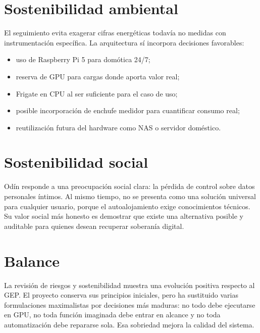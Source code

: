 \section{Sostenibilidad ambiental}
El seguimiento evita exagerar cifras energéticas todavía no medidas con instrumentación específica. La arquitectura sí incorpora decisiones favorables:
\begin{itemize}
  \item uso de Raspberry Pi 5 para domótica 24/7;
  \item reserva de GPU para cargas donde aporta valor real;
  \item Frigate en CPU al ser suficiente para el caso de uso;
  \item posible incorporación de enchufe medidor para cuantificar consumo real;
  \item reutilización futura del hardware como NAS o servidor doméstico.
\end{itemize}

\section{Sostenibilidad social}
Odín responde a una preocupación social clara: la pérdida de control sobre datos personales íntimos. Al mismo tiempo, no se presenta como una solución universal para cualquier usuario, porque el autoalojamiento exige conocimientos técnicos. Su valor social más honesto es demostrar que existe una alternativa posible y auditable para quienes desean recuperar soberanía digital.

\section{Balance}
La revisión de riesgos y sostenibilidad muestra una evolución positiva respecto al GEP. El proyecto conserva sus principios iniciales, pero ha sustituido varias formulaciones maximalistas por decisiones más maduras: no todo debe ejecutarse en GPU, no toda función imaginada debe entrar en alcance y no toda automatización debe repararse sola. Esa sobriedad mejora la calidad del sistema.
